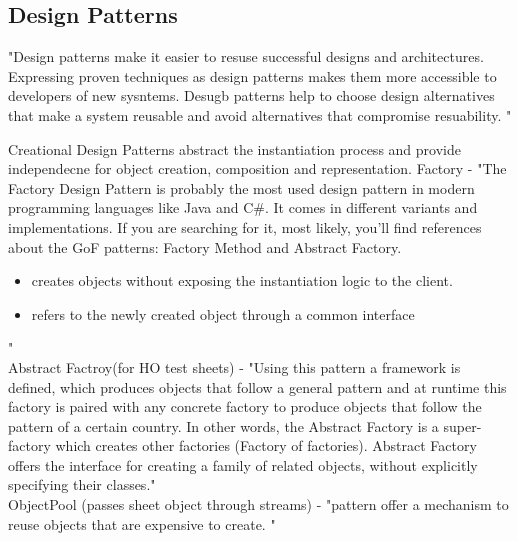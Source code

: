 
\subsection{Design Patterns}
"Design patterns make it easier to resuse successful designs and architectures. Expressing proven techniques as design patterns makes them more accessible to developers of new sysntems. Desugb patterns help to choose design alternatives that make a system reusable and avoid alternatives that compromise resuability. "\cite{DesignPatterns}


Creational Design Patterns abstract the instantiation process and provide independecne for object creation, composition and representation. 
Factory - "The Factory Design Pattern is probably the most used design pattern in modern programming languages like Java and C\#. It comes in different variants and implementations. If you are searching for it, most likely, you'll find references about the GoF patterns: Factory Method and Abstract Factory.
\begin{itemize}
\item creates objects without exposing the instantiation logic to the client.
\item refers to the newly created object through a common interface
\end{itemize}"\cite{oosite}\\


Abstract Factroy(for HO test sheets) - "Using this pattern a framework is defined, which produces objects that follow a general pattern and at runtime this factory is paired with any concrete factory to produce objects that follow the pattern of a certain country. In other words, the Abstract Factory is a super-factory which creates other factories (Factory of factories).
Abstract Factory offers the interface for creating a family of related objects, without explicitly specifying their classes."\cite{oosite}\\

ObjectPool (passes sheet object through streams) - "pattern offer a mechanism to reuse objects that are expensive to create. "\cite{oosite}\\


